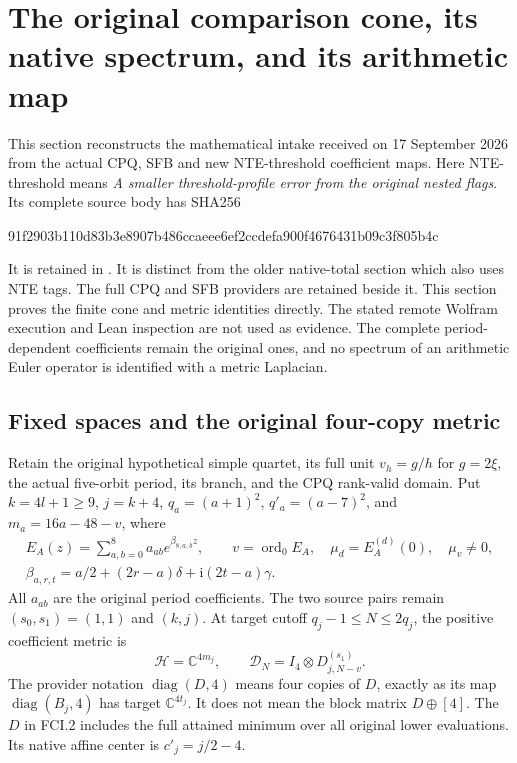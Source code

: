 \section{The original comparison cone, its native spectrum, and its arithmetic map}
\label{sec:fci}

This section reconstructs the mathematical intake received on 17 September
2026 from the actual CPQ, SFB and new NTE-threshold coefficient maps.
Here NTE-threshold means \emph{A smaller threshold-profile error from
the original nested flags}.  Its complete source body has SHA256
\begin{center}\small\ttfamily
91f2903b110d83b3e8907b486ccaeee6ef2ccdefa900f4676431b09c3f805b4c
\end{center}
It is retained in .
It is distinct from the older native-total section which also uses
NTE tags.  The full CPQ and SFB providers are retained beside it.
This section proves the
finite cone and metric identities directly.  The stated remote Wolfram
execution and Lean inspection are not used as evidence.  The complete
period-dependent coefficients remain the original ones, and no spectrum
of an arithmetic Euler operator is identified with a metric Laplacian.

\subsection{Fixed spaces and the original four-copy metric}

Retain the original hypothetical simple quartet, its full unit $v_h=g/h$
for $g=2\xi$, the actual five-orbit period, its branch, and the CPQ
rank-valid domain.  Put $k=4l+1\geq9$, $j=k+4$, $q_a=(a+1)^2$,
$q'_a=(a-7)^2$, and $m_a=16a-48-v$, where
\[
 \begin{gathered}
 E_A(z)=\sum_{a,b=0}^8a_{ab}e^{\beta_{8,a,b}z},\qquad
 v=\operatorname{ord}_0E_A,\quad \mu_d=E_A^{(d)}(0),\quad \mu_v\ne0,\\
 \beta_{a,r,t}=a/2+(2r-a)\delta+\mathrm i(2t-a)\gamma.
 \end{gathered}
 \tag{FCI.1}
\]
All $a_{ab}$ are the original period coefficients.  The two source pairs
remain $(s_0,s_1)=(1,1)$ and $(k,j)$.  At target cutoff
$q_j-1\leq N\leq2q_j$, the positive coefficient metric is
\[
 \mathcal H=\mathbb C^{4m_j},\qquad
 \mathcal D_N=I_4\otimes D_{j,N-v}^{(s_1)}.
 \tag{FCI.2}
\]
The provider notation $\operatorname{diag}(D,4)$ means four copies of
$D$, exactly as its map $\operatorname{diag}(B_j,4)$ has target
$\mathbb C^{4t_j}$.  It does not mean the block matrix $D\oplus[4]$.
The $D$ in FCI.2 includes the full attained minimum over all original
lower evaluations.  Its native affine center is $c'_j=j/2-4$.

